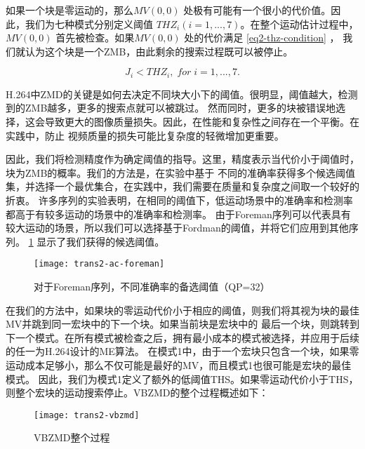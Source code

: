 如果一个块是零运动的，那么$MV(0, 0)$ 处极有可能有一个很小的代价值。因此，我们为七种模式分别定义阈值 
$THZ_i(i=1,...,7)$。在整个运动估计过程中，$MV(0, 0)$ 首先被检查。如果$MV(0, 0)$ 处的代价满足 \ref{eq2-thz-condition} ，
我们就认为这个块是一个ZMB，由此剩余的搜索过程既可以被停止。

\begin{equation}
\label{eq2-thz-condition}
J_i < THZ_i, \; for \; i = 1,...,7.
\end{equation}

H.264中ZMD的关键是如何去决定不同块大小下的阈值。很明显，阈值越大，检测到的ZMB越多，更多的搜索点就可以被跳过。
然而同时，更多的块被错误地选择，这会导致更大的图像质量损失。因此，在性能和复杂性之间存在一个平衡。在实践中，防止
视频质量的损失可能比复杂度的轻微增加更重要。

因此，我们将检测精度作为确定阈值的指导。这里，精度表示当代价小于阈值时，块为ZMB的概率。我们的方法是，在实验中基于
不同的准确率获得多个候选阈值集，并选择一个最优集合，在实践中，我们需要在质量和复杂度之间取一个较好的折衷。
许多序列的实验表明，在相同的阈值下，低运动场景中的准确率和检测率都高于有较多运动的场景中的准确率和检测率。
由于Foreman序列可以代表具有较大运动的场景，所以我们可以选择基于Fordman的阈值，并将它们应用到其他序列。 
\ref{fig:trans2-ac-foreman} 显示了我们获得的候选阈值。

\begin{figure}[H] %
  \centering
  \texttt{[image: trans2-ac-foreman]}
  \caption{对于Foreman序列，不同准确率的备选阈值（QP=32）}
  \label{fig:trans2-ac-foreman}
\end{figure}

在我们的方法中，如果块的零运动代价小于相应的阈值，则我们将其视为块的最佳MV并跳到同一宏块中的下一个块。如果当前块是宏块中的
最后一个块，则跳转到下一个模式。在所有模式被检查之后，拥有最小成本的模式被选择，并应用于后续的任一为H.264设计的ME算法。
在模式1中，由于一个宏块只包含一个块，如果零运动成本足够小，那么不仅可能是最好的MV，而且模式1也很可能是宏块的最佳模式。
因此，我们为模式1定义了额外的低阈值THS。如果零运动代价小于THS，则整个宏块的运动搜索停止。VBZMD的整个过程概述如下：

\begin{figure}[H] %
  \centering
  \texttt{[image: trans2-vbzmd]}
  \caption{VBZMD整个过程}
  \label{fig:trans2-vbzmd}
\end{figure}

